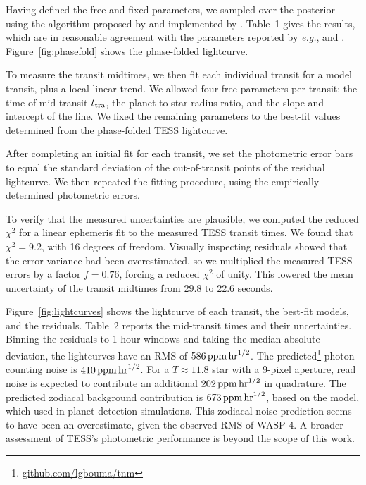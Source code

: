 \documentclass[12pt,twocolumn,tighten]{aastex62}
\begin{document}
Having defined the free and fixed parameters, we sampled over the
posterior using the algorithm proposed by
\citet{goodman_ensemble_2010} and implemented by
\citet{foreman-mackey_emcee_2013}.  Table~1 gives the results, which
are in reasonable agreement with the parameters reported by {\it
e.g.}, \citet{southworth_high-precision_2009} and
\citet{huitson_gemini_2017}.
Figure~\ref{fig:phasefold} shows the phase-folded lightcurve.

To measure the transit midtimes, we then fit  each individual transit
for a model transit, plus a local linear trend.  We allowed four free 
parameters per transit: the time of
mid-transit $t_{\rm tra}$, the planet-to-star radius ratio, and the
slope and intercept of the line.  We fixed the remaining
parameters%
to the best-fit values determined from the
phase-folded TESS lightcurve.

After completing an initial fit for each transit, we set the
photometric error bars to equal the standard deviation of the
out-of-transit points of the residual lightcurve.  We then repeated
the fitting procedure, using the empirically determined photometric
errors.

To verify that the measured uncertainties are plausible, we computed
the reduced $\chi^2$ for a linear ephemeris fit to the measured TESS
transit times.  We found that $\chi^2 = 9.2$, with 16 degrees of
freedom.  Visually inspecting residuals showed that the error variance
had been overestimated, so we multiplied the measured TESS errors by a
factor $f=0.76$, forcing a reduced $\chi^2$ of unity.  This lowered
the mean uncertainty of the transit midtimes from $29.8$ to $22.6$
seconds.

Figure~\ref{fig:lightcurves} shows the lightcurve of each transit, the
best-fit models, and the residuals.  Table~2 reports the mid-transit
times and their uncertainties.
Binning the residuals to 1-hour windows and taking the median absolute
deviation, the lightcurves have an RMS of $586\,{\rm ppm}\,{\rm
hr}^{1/2}$.  The predicted\footnote{\url{github.com/lgbouma/tnm}}
photon-counting noise is $410\,{\rm ppm}\,{\rm hr}^{1/2}$.  For a
$T\approx11.8$ star with a 9-pixel aperture, read noise is expected to
contribute an additional $202\,{\rm ppm}\,{\rm hr}^{1/2}$ in
quadrature.  The predicted zodiacal background contribution is
$673\,{\rm ppm}\,{\rm hr}^{1/2}$, based on the
\citet{winn_photonflux_2013} model, which \citet{Sullivan_2015} used
in planet detection simulations.  This zodiacal noise prediction seems
to have been an overestimate, given the observed RMS of WASP-4.  A
broader assessment of TESS's photometric performance is beyond
the scope of this work.
\end{document}
